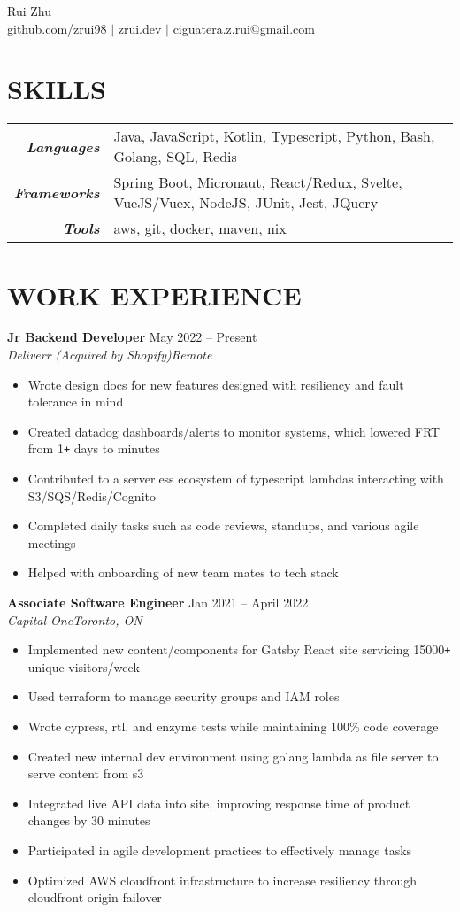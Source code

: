 \documentclass[letterpaper]{article}
\newcommand{\Header}[2]{\begin{center}
	\huge\usefont{OT1}{lmss}{m}{n}
		#1 \\
	\small{#2}
\end{center}}
\newcommand{\SplitEntry}[2]{\textbf{\textit{#1}} & \small{#2}\\}
\newcommand{\NewPart}[1]{\section*{\large\uppercase{\textbf{#1}}}}
\newcommand{\DatedEntry}[5]{\small\textbf{#1}
	\hfill \small{#2}\\
	\textit{#3}\hfill\textit{#4}\\\vspace{0.1cm}
	#5\vspace{0.1cm}
}
\begin{document}
\Header{Rui Zhu}{\href{https://github.com/zrui98}{github.com/zrui98} $|$ \href{https://zrui.dev}{zrui.dev} $|$ \href{mailto:ciguatera.z.rui@gmail.ca}{ciguatera.z.rui@gmail.com}}\vspace{-0.5cm}

\NewPart{Skills}
\begin{tabular}{r|l}
	\SplitEntry{Languages}{Java, JavaScript, Kotlin, Typescript, Python, Bash, Golang, SQL, Redis}
	\SplitEntry{Frameworks}{Spring Boot, Micronaut, React/Redux, Svelte, VueJS/Vuex, NodeJS, JUnit, Jest, JQuery}
	\SplitEntry{Tools}{aws, git, docker, maven, nix}
\end{tabular}\vspace{-0.2cm}

\NewPart{Work Experience}
\DatedEntry{Jr Backend Developer}
{May 2022 -- Present}
{Deliverr (Acquired by Shopify)}
{Remote}
{\begin{itemize}[nolistsep]
	\item Wrote design docs for new features designed with resiliency and fault tolerance in mind
	\item Created datadog dashboards/alerts to monitor systems, which lowered FRT from 1\texttt{+} days to minutes
	\item Contributed to a serverless ecosystem of typescript lambdas interacting with S3/SQS/Redis/Cognito
	\item Completed daily tasks such as code reviews, standups, and various agile meetings
	\item Helped with onboarding of new team mates to tech stack
\end{itemize}}
\DatedEntry{Associate Software Engineer}
{Jan 2021 -- April 2022}
{Capital One}
{Toronto, ON}
{\begin{itemize}[nolistsep]
	\item Implemented new content/components for Gatsby React site servicing 15000\texttt{+} unique visitors/week
	\item Used terraform to manage security groups and IAM roles
	\item Wrote cypress, rtl, and enzyme tests while maintaining 100\% code coverage
	\item Created new internal dev environment using golang lambda as file server to serve content from s3
	\item Integrated live API data into site, improving response time of product changes by 30 minutes
	\item Participated in agile development practices to effectively manage tasks 
	\item Optimized AWS cloudfront infrastructure to increase resiliency through cloudfront origin failover
\end{itemize}}
\end{document}

